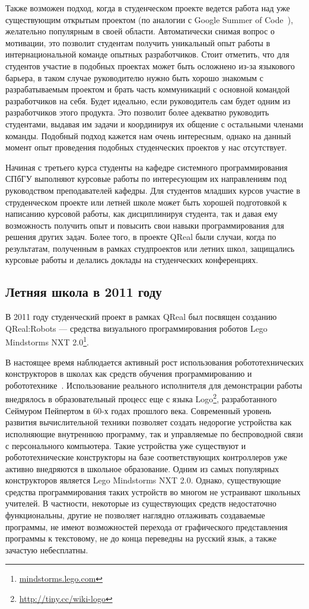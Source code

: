\documentclass[a4paper]{article}
\begin{document}
Также возможен подход, когда в студенческом проекте ведется работа над уже существующим открытым проектом (по аналогии с Google Summer of Code~\cite{google}), желательно популярным в своей области. Автоматически снимая вопрос о мотивации, это позволит студентам получить уникальный опыт работы в интернациональной команде опытных разработчиков. Стоит отметить, что для студентов участие в подобных проектах может быть осложнено из-за языкового барьера, в таком случае руководителю нужно быть хорошо знакомым с разрабатываемым проектом и брать часть коммуникаций с основной командой разработчиков на себя. Будет идеально, если руководитель сам будет одним из разработчиков этого продукта. Это позволит более адекватно руководить студентами, выдавая им задачи и координируя их общение с остальными членами команды. Подобный подход кажется нам очень интересным, однако на данный момент опыт проведения подобных студенческих проектов у нас отсутствует.

Начиная с третьего курса студенты на кафедре системного программирования СПбГУ выполняют курсовые работы по интересующим их направлениям под руководством преподавателей кафедры. Для студентов младших курсов участие в струденческом проекте или летней школе может быть хорошей подготовкой к написанию курсовой работы, как дисциплинируя студента, так и давая ему возможность получить опыт и повысить свои навыки программирования для решения других задач. Более того, в проекте QReal были случаи, когда по результатам, полученным в рамках студпроектов или летних школ, защищались курсовые работы и делались доклады на студенческих конференциях.


\subsection{Летняя школа в 2011 году}

В 2011 году студенческий проект в рамках QReal был посвящен созданию QReal:Robots --- средства визуального программирования роботов Lego Mindstorms NXT 2.0\footnote{\url{mindstorms.lego.com}}. 

В настоящее время наблюдается активный рост использования робототехнических конструкторов в школах как средств обучения программированию и робототехнике~\cite{filippov}.  Использование реального исполнителя для демонстрации работы внедрялось в образовательный процесс еще с языка Logo\footnote{\url{http://tiny.cc/wiki-logo}}, разработанного Сеймуром Пейпертом в 60-х годах прошлого века. Современный уровень развития вычислительной техники позволяет создать недорогие устройства как исполняющие внутреннюю программу, так и управляемые по беспроводной связи с персонального компьютера. Такие устройства уже существуют и робототехнические конструкторы на базе соответствующих контроллеров уже активно внедряются в школьное образование. Одним из самых популярных конструкторов является Lego Mindstorms NXT 2.0. Однако, существующие средства программирования таких устройств во многом не устраивают школьных учителей. В частности, некоторые из существующих средств недостаточно функциональны, другие не позволяет наглядно отлаживать создаваемые программы, не имеют возможностей перехода от графического представления программы к текстовому, не до конца переведны на русский язык, а также зачастую небесплатны.
\end{document}
